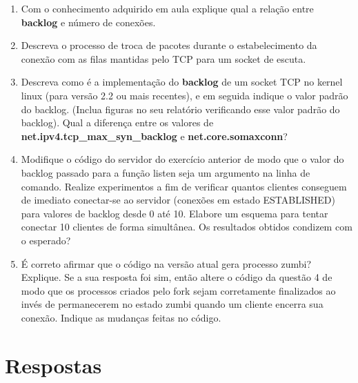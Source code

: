 \documentclass[12pt,a4paper]{report}
\begin{document}
\begin{enumerate}
    \item Com o conhecimento adquirido em aula explique qual a relação entre \textbf{backlog} e número de conexões.
    
    \item Descreva o processo de troca de pacotes durante o estabelecimento da conexão com as filas mantidas pelo TCP para um socket de escuta.
    
    \item Descreva como é a implementação do \textbf{backlog} de um socket TCP no kernel linux (para versão 2.2 ou mais recentes), e em seguida indique o valor padrão do backlog. (Inclua figuras no seu relatório verificando esse valor padrão do backlog). Qual a diferença entre os valores de \textbf{net.ipv4.tcp\_max\_syn\_backlog} e \textbf{net.core.somaxconn}?
    
    \item Modifique o código do servidor do exercício anterior de modo que o valor do backlog passado para a função listen seja um argumento na linha de comando. Realize experimentos a fim de verificar quantos clientes conseguem de imediato conectar-se ao servidor (conexões em estado ESTABLISHED) para valores de backlog desde 0 até 10. Elabore um esquema para tentar conectar 10 clientes de forma simultânea. Os resultados obtidos condizem com o esperado?
    
    \item É correto afirmar que o código na versão atual gera processo zumbi? Explique. Se a sua resposta foi sim, então altere o código da questão 4 de modo que os processos criados pelo fork sejam corretamente finalizados ao invés de permanecerem no estado zumbi quando um cliente encerra sua conexão. Indique as mudanças feitas no código.
\end{enumerate}

\section{Respostas}
\end{document}
